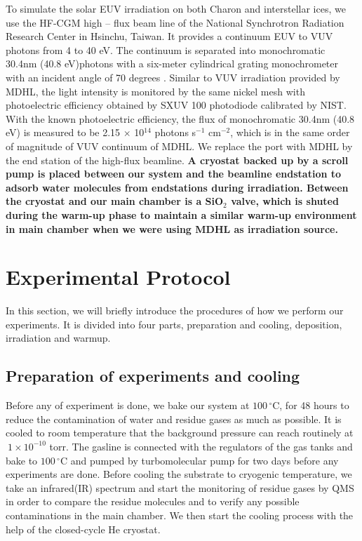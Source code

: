 To simulate the solar EUV irradiation on both Charon and interstellar ices, we use the HF-CGM high – flux beam line of the National Synchrotron Radiation Research Center in Hsinchu, Taiwan. It provides a continuum EUV to VUV photons from 4 to 40 eV. The continuum is separated into monochromatic 30.4nm (40.8 eV)photons with a six-meter cylindrical grating monochrometer with an incident angle of 70 degrees \cite{hsieh1998design}. Similar to VUV irradiation provided by MDHL, the light intensity is monitored by the same nickel mesh with photoelectric efficiency obtained by SXUV 100 photodiode calibrated by NIST. With the known photoelectric efficiency, the flux of monochromatic 30.4nm (40.8 eV) is measured to be 2.15 $\times$ 10$^{14}$ photons s$^{-1}$ cm$^{-2}$, which is in the same order of magnitude of VUV continuum of MDHL. We replace the port with MDHL by the end station of the high-flux beamline. \textbf{A cryostat backed up by a scroll pump is placed between our system and the beamline endstation to adsorb water molecules from endstations during irradiation. Between the cryostat and our main chamber is a SiO$_2$ valve, which is shuted during the warm-up phase to maintain a similar warm-up environment in main chamber when we were using MDHL as irradiation source.}

\section{Experimental Protocol}
\label{sec:Experimental_Protocol}

In this section, we will briefly introduce the  procedures of how we perform our experiments. It is divided into four parts, preparation and cooling, deposition, irradiation and warmup.

\subsection{Preparation of experiments and cooling}
Before any of experiment is done, we bake our system at $100 \,^{\circ}\mathrm{C}$, for 48 hours to reduce the contamination of water and residue gases as much as possible. It is cooled to room temperature that the background pressure can reach routinely at $~ 1 \times 10^{-10}$ torr. The gasline is connected with the regulators of the gas tanks and bake to $100\,^{\circ}\mathrm{C}$ and pumped by turbomolecular pump for two days before any experiments are done. Before cooling the substrate to cryogenic temperature, we take an infrared(IR) spectrum and start the monitoring of residue gases by QMS in order to compare the residue molecules and to verify any possible contaminations in the main chamber. We then start the cooling process with the help of the closed-cycle He cryostat.

